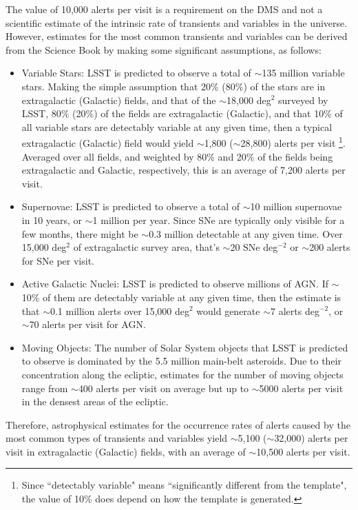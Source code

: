 \documentclass[DM,authoryear,toc]{lsstdoc}
\begin{document}
The value of 10,000 alerts per visit is a requirement on the \gls{DMS} and not a scientific estimate of the intrinsic rate of transients and variables in the universe. However, estimates for the most common transients and variables can be derived from the Science Book \citep{2009arXiv0912.0201L} by making some significant assumptions, as follows:
\begin{itemize}
\item Variable Stars: \gls{LSST} is predicted to observe a total of $\sim$135 million variable stars. Making the simple assumption that 20\% (80\%) of the stars are in extragalactic (Galactic) fields, and that of the $\sim$18,000 \gls{deg}$^2$ surveyed by \gls{LSST}, 80\% (20\%) of the fields are extragalactic (Galactic), and that 10\% of all variable stars are detectably variable at any given time, then a typical extragalactic (Galactic) field would yield $\sim$1,800 ($\sim$28,800) alerts per visit \footnote{Since ``detectably variable" means ``significantly different from the template", the value of 10\% does depend on how the template is generated.}. Averaged over all fields, and weighted by 80\% and 20\% of the fields being extragalactic and Galactic, respectively, this is an average of 7,200 alerts per visit.
\item Supernovae: \gls{LSST} is predicted to observe a total of $\sim$10 million supernovae in 10 years, or $\sim$1 million per year. Since SNe are typically only visible for a few months, there might be $\sim$0.3 million detectable at any given time. Over 15,000 \gls{deg}$^{2}$ of extragalactic survey area, that's $\sim$20 SNe \gls{deg}$^{-2}$ or $\sim$200 alerts for SNe per visit.
\item Active Galactic Nuclei: \gls{LSST} is predicted to observe millions of AGN. If $\sim$10\% of them are detectably variable at any given time, then the estimate is that $\sim$0.1 million alerts over 15,000 \gls{deg}$^2$ would generate $\sim$7 alerts \gls{deg}$^{-2}$, or $\sim$70 alerts per visit for AGN.
\item Moving Objects: The number of Solar System objects that \gls{LSST} is predicted to observe is dominated by the 5.5 million main-belt asteroids. Due to their concentration along the ecliptic, estimates for the number of moving objects range from $\sim$400 alerts per visit on average but up to $\sim$5000 alerts per visit in the densest areas of the ecliptic.
\end{itemize}
Therefore, astrophysical estimates for the occurrence rates of alerts caused by the most common types of transients and variables yield $\sim$5,100 ($\sim$32,000) alerts per visit in extragalactic (Galactic) fields, with an average of $\sim$10,500 alerts per visit.
\end{document}
